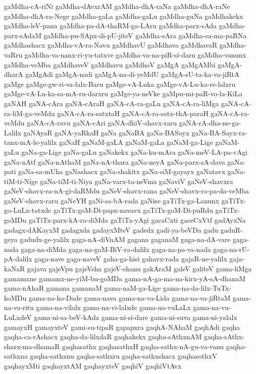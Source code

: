 {gaMdha-cA-riNi
gaMdha-dAvxrAM
gaMdha-dhA-raNa
gaMdha-dhA-raNe
gaMdha-dhA-ra-Nege
gaMdha-gaLa
gaMdha-gaLu
gaMdha-guNa
gaMdhakekx
gaMdha-leV-pana
gaMdha-pa-dA-thaRM-ga-LAru
gaMdha-parx-sAda
gaMdha-parx-sAdaM
gaMdha-pu-SApx-di-pU-jiteV
gaMdha-sAra
gaMdha-sa-ma-paRNa
gaMdhashacx
gaMdha-vA-ra-Navu
gaMdhavU
gaMdhava
gaMdhavaR
gaMdha-vaRru
gaMdha-va-nanx-ri-yu-tatxve
gaMdha-va-na-piR-si-daru
gaMdha-vanunx
gaMdha-veMba
gaMdhaveV
gaMdhavu
gaMdhoV
gaMgA
gaMgAMbi
gaMgA-dharA
gaMgAdi
gaMgA-nadi
gaMgA-na-di-yeMdU
gaMgA-sU-ta-ka-va-jiRtA
gaMge
gaMge-gw-ri-va-lalx-Baru
gaMge-vA-Luka
gaMge-vA-Lu-ka-re-lalxru
gaMge-vA-Lu-ka-sa-mA-ru-darxru
gaMge-ya-neVke
gaMpu-mi-paR-vo-la-KiLa
gaNAH
gaNA-cAra
gaNA-cAraH
gaNA-cA-ra-gaLu
gaNA-cA-ra-liMga
gaNA-cA-ra-liM-ga-veMdu
gaNA-cA-ra-satxtaH
gaNA-cA-ra-satx-thA-paraH
gaNA-cA-ra-veMdu
gaNA-cA-ravu
gaNA-cAri
gaNA-dhiV-shavx-raru
gaNA-rA-dha-ne-ga-Lalilx
gaNAyaR
gaNA-yaRkaH
gaNa
gaNaBA
gaNa-BASayx
gaNa-BA-Sayx-ra-tanx-mA-le-yalilx
gaNaH
gaNaM-gaLA
gaNaM-gaLa
gaNaM-ga-Lige
gaNaM-gaLu
gaNa-ga-Lige
gaNa-gaLu
gaNakekx
gaNa-ku-mAra
gaNa-meV-LA-pa-vAgi
gaNa-nAtf
gaNa-nAthaM
gaNa-nA-thara
gaNa-neyA
gaNa-parx-sA-dava
gaNa-pati
gaNa-sa-mUha
gaNashacx
gaNa-shakitx
gaNa-siM-gayayx
gaNatavx
gaNa-tiM-ti-Nige
gaNa-tiM-ti-Niya
gaNa-varx-ta-neVma
gaNaviV
gaNeV-shavxra
gaNeV-shavx-ra-nA-gi-daRMdu
gaNeV-shavx-rana
gaNeV-shavx-ra-pa-da-veMba
gaNeV-shavx-raru
gaNeYH
gaNi-sa-bA-rada
gaNise
gaTiTx-ga-Lanunx
gaTiTx-go-LuLx-tatxde
gaTiTx-goM-Di-papx-navavx
gaTiTx-goM-Di-puRdu
gaTiTx-goMDu
gaTiTx-parx-kA-ra-diMda
gaTiTx-yAgi
gacaCxti
gaceCxVtf
gadAyxNa
gadagx-dAKayxM
gadagxda
gadayxMteV
gadedx
gadi-ya-beVDa
gadu
gaduR-geya
gadudx-ge-yalilx
gaga-nA-diVnAM
gagana
gaganaM
gaga-na-dA-vare
gaga-nada
gaga-na-diMda
gaga-na-gaM-BiV-ra-dalilx
gaga-na-pa-va-nada
gaga-na-rU-pA-dalilx
gaga-nave
gaga-naveV
gaha-ga-hisi
gahavx-rada
gajaR-ne-yalilx
gaja-kaNaR
gajava
gajeVpu
gajeVsha
gajeV-shanu
gakAraM
galeV
galiteV
gama-liMga
gamamxne
gamamx-ne-yiM-bu-goMDa
gama-nA-ga-ma-na-kirx-yA-sA-dhanaM
gama-nAhaR
gamana
gamanaM
gama-naM-ga-Lige
gama-na-da-lilx-TuTx-koMDu
gama-na-ko-Dade
gama-nava
gama-na-va-Lida
gama-na-va-jiRtaM
gama-na-va-ritu
gama-na-vilalx
gama-na-vi-lalxde
gama-na-vuLaLx
gama-na-vu-LuLxdeV
gama-ni-sa-beV-kAda
gama-ni-si-dare
gama-ni-suva
gama-ni-yalalx
gamayxH
gamayxteV
gami-su-tipaR
gapapxra
gaqhA-NAhaM
gaqhAdi
gaqha
gaqha-ca-rAshacx
gaqha-da-lilxdaR
gaqhakekx
gaqha-sAthxnAM
gaqha-sAthx-sharx-ma-dhamaR
gaqhasathx
gaqhasathxH
gaqha-sathx-nA-gu-va-vanu
gaqha-sathxna
gaqha-sathxnu
gaqha-sathxru
gaqha-sathxshacx
gaqhasothxV
gaqhayxMti
gaqhayxtAM
gaqhayxteV
gaqhiV
gaqhiVtAvx
}
